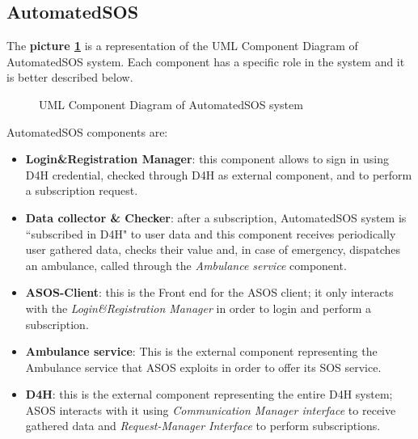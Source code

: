 \subsection{AutomatedSOS}

The \textbf{picture \ref{fig:ASOS-component}} is a representation of the UML Component Diagram of AutomatedSOS system. Each component has a specific role in the system and it is better described below. 

\begin{figure}[H]
    \centering
    \caption{UML Component Diagram of AutomatedSOS system}
    \label{fig:ASOS-component}
\end{figure}

AutomatedSOS components are:
\begin{itemize}
    \item \textbf{Login\&Registration Manager}: this component allows to sign in using D4H credential, checked through D4H as external component, and to perform a subscription request.
    \item \textbf{Data collector \& Checker}: after a subscription, AutomatedSOS system is ``subscribed in D4H" to user data and this component receives periodically user gathered data, checks their value and, in case of emergency, dispatches an ambulance, called through the \emph{Ambulance service} component.
    \item \textbf{ASOS-Client}: this is the Front end for the ASOS client; it only interacts with the \emph{Login\&Registration Manager} in order to login and perform a subscription.
    \item \textbf{Ambulance service}: This is the external component representing the Ambulance service that ASOS exploits in order to offer its SOS service.
    \item \textbf{D4H}: this is the external component representing the entire D4H system; ASOS interacts with it using \emph{Communication Manager interface} to receive gathered data and \emph{Request-Manager Interface} to perform subscriptions.
\end{itemize}

